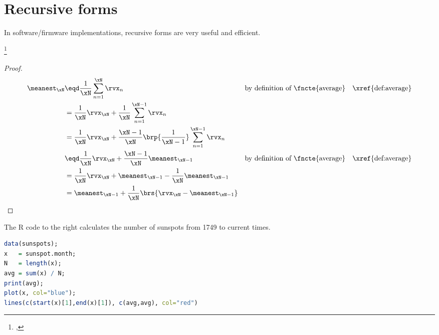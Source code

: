 \section{Recursive forms}
In software/firmware implementations, recursive forms are very useful and efficient.
\begin{proposition}
\footnote{
  ,
  }
\label{prop:average_recursive}
\end{proposition}
\begin{proof}
\begin{align*}
  \meanest_{\xN}
    &\eqd \frac{1}{\xN} \sum_{n=1}^{\xN} \rvx_n
    && \text{by definition of \fncte{average}}
    && \text{\xref{def:average}}
  \\&= \frac{1}{\xN}\rvx_{\xN} + \frac{1}{\xN} \sum_{n=1}^{\xN-1} \rvx_n
  \\&= \frac{1}{\xN}\rvx_{\xN} + \frac{\xN-1}{\xN}\brp{\frac{1}{\xN-1}} \sum_{n=1}^{\xN-1} \rvx_n
  \\&\eqd \frac{1}{\xN}\rvx_{\xN} + \frac{\xN-1}{\xN}\meanest_{\xN-1}
    && \text{by definition of \fncte{average}}
    && \text{\xref{def:average}}
  \\&= \frac{1}{\xN}\rvx_{\xN} + \meanest_{\xN-1} - \frac{1}{\xN}\meanest_{\xN-1}
  \\&= \meanest_{\xN-1}
     + \frac{1}{\xN} \brs{\rvx_{\xN} - \meanest_{\xN-1}}
\end{align*}
\end{proof}

\begin{minipage}{\tw-115mm}
\begin{example}
The R code to the right 
 calculates the 
 number of sunspots
from 1749 to current times.
\end{example}
\end{minipage}
\hfill
\begin{minipage}{110mm}
\begin{lstlisting}[language=R]
data(sunspots);     
x   = sunspot.month;
N   = length(x);    
avg = sum(x) / N;
print(avg);
plot(x, col="blue");
lines(c(start(x)[1],end(x)[1]), c(avg,avg), col="red")
\end{lstlisting}
\end{minipage}
